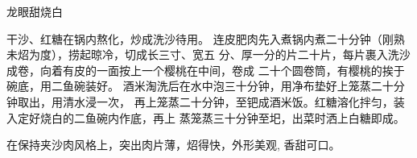 \begin{recipe}{龙眼甜烧白}

\ingredients


\cooking

\step 干沙、红糖在锅内熬化，炒成洗沙待用。
\step 连皮肥肉先入煮锅内煮二十分钟（刚熟未炤为度），捞起晾冷，切成长三寸、宽五
分、厚一分的片二十片，每片裹入洗沙成卷，向着有皮的一面按上一个樱桃在中间，卷成
二十个圆卷筒，有樱桃的挨于碗底，用二鱼碗装好。
\step 酒米淘洗后在水中泡三十分钟，用净布垫好上笼蒸二十分钟取出，用清水浸一次，
再上笼蒸二十分钟，至钯成酒米饭。红糖溶化拌匀，装入定好烧白的二鱼碗内作底，再上
蒸笼蒸三十分钟至圯，出菜时洒上白糖即成。

\notes

在保持夹沙肉风格上，突出肉片薄，炤得快，外形美观, 香甜可口。

\end{recipe}

